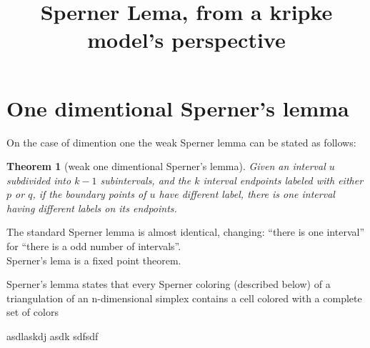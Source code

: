 \documentclass{article}
\title{Sperner Lema, from a kripke model's perspective}
\date{}
\newtheorem{theorem}{Theorem}[section]
\theoremstyle{definition}
\theoremstyle{remark}
\begin{document}
\maketitle


\section{One dimentional Sperner's lemma }

On the case of dimention one the weak Sperner lemma can be stated as follows:

\begin{theorem}[weak one dimentional Sperner's lemma]
    Given an interval $u$ subdivided into $k-1$ subintervals, and the $k$ interval endpoints labeled with either $p$ or $q$, if the boundary points of $u$ have different label, there is one interval having different labels on its endpoints.\\
\end{theorem}

The standard Sperner lemma is almost identical, changing:
``there is one interval'' for ``there is a odd number of intervals''.\\





Sperner's lema is a fixed point theorem.

Sperner's lemma states that every Sperner coloring (described below) of a triangulation of an n-dimensional simplex contains a cell colored with a complete set of colors

asdlaskdj asdk  \cite{Huang_onthe} sdfsdf
\end{document}

